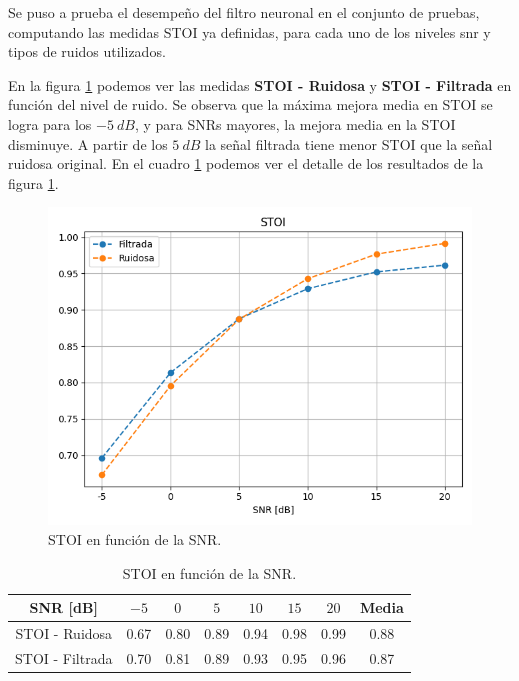 Se puso a prueba el desempeño del filtro neuronal en el conjunto de pruebas, computando las medidas STOI ya definidas, para cada uno de los niveles snr y tipos de ruidos utilizados. 

En la figura \ref{fig:ch7_stoi_by_snr} podemos ver las medidas \textbf{STOI - Ruidosa} y \textbf{STOI - Filtrada} en función del nivel de ruido. Se observa que la máxima mejora media en STOI se logra para los $\SI{-5}{dB}$, y para SNRs mayores, la mejora media en la STOI disminuye. A partir de los $\SI{5}{dB}$ la señal filtrada tiene menor STOI que la señal ruidosa original. En el cuadro \ref{table:ch7_stoi_by_snr} podemos ver el detalle de los resultados de la figura \ref{fig:ch7_stoi_by_snr}.

\begin{figure}
	\centering
	\centerline{\includegraphics[scale=0.8]{images/ch7/stoi_by_snr.png}}
	\caption{STOI en función de la SNR.}
	\label{fig:ch7_stoi_by_snr}
\end{figure}

\begin{table}
	\centering
	\begin{tabular}{ |c|c|c|c|c|c|c|c| } 
		\hline
		SNR [dB] & $-5$ & $0$ & $5$ & $10$ & $15$ & $20$ & Media \\ 
		\hline
		STOI - Ruidosa & 0.67 & 0.80 & 0.89 & 0.94 & 0.98 & 0.99 & 0.88 \\
		STOI - Filtrada & 0.70 & 0.81 & 0.89 & 0.93 & 0.95 & 0.96 & 0.87 \\
		\hline
	\end{tabular}
	\caption{STOI en función de la SNR.}
	\label{table:ch7_stoi_by_snr}
\end{table}


